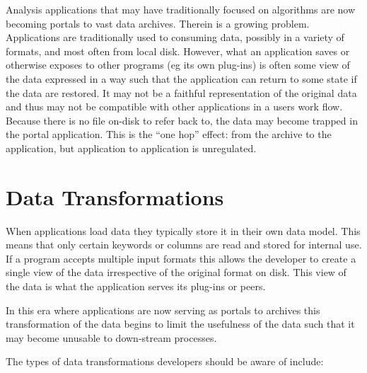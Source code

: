 Analysis applications that may have traditionally focused on 
algorithms are now becoming portals to vast data archives.  Therein is a
growing problem.  Applications are traditionally used to consuming data, 
possibly in a variety of formats, and most often from local disk.  However, 
what an application saves or otherwise exposes to other programs (eg its own
plug-ins) is often some view of the data expressed in a way such that the
application can return to some state if the data are restored.  It may not be
a faithful representation of the original data and thus may not be 
compatible with other applications in a users work flow.  Because there
is no file on-disk to refer back to, the data may become trapped in the
portal application.  This is the ``one hop'' effect:  from the archive
to the application, but application to application is unregulated.


\section{Data Transformations}

When applications load data they typically store it in their own data model.
This means that only certain keywords or columns are read and stored for
internal use.  If a program accepts multiple input formats this allows the
developer to create a single view of the data irrespective of the
original format on disk.  This view of the data is what the application
serves its plug-ins or peers.

In this era where applications are now serving as portals to archives this 
transformation of the data begins to limit the usefulness of the data such
that it may become unusable to down-stream processes.

The types of data transformations developers should be aware of include:

